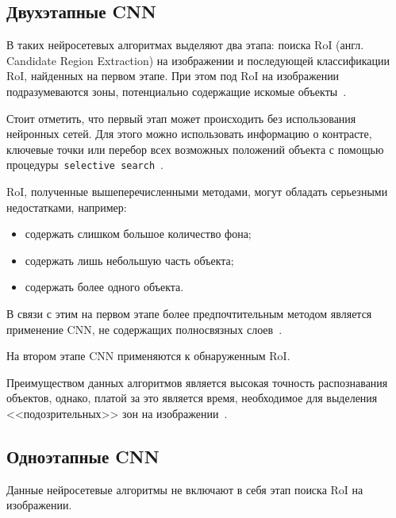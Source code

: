 \subsection{Двухэтапные CNN}

В таких нейросетевых алгоритмах выделяют два этапа: поиска RoI (англ. Candidate Region Extraction) на изображении и последующей классификации RoI, найденных на первом этапе. При этом под RoI на изображении подразумеваются зоны, потенциально содержащие искомые объекты~\cite{overview-of-two-stage-object-detection}. 


Стоит отметить, что первый этап может происходить без использования нейронных сетей. Для этого можно использовать информацию о контрасте, ключевые точки или перебор всех возможных положений объекта с помощью процедуры~\texttt{selective search}~\cite{realtime-recognition-algorythm}.

RoI, полученные вышеперечисленными методами, могут обладать серьезными недостатками, например:
\begin{itemize}[label=---]
    \item содержать слишком большое количество фона;
    \item содержать лишь небольшую часть объекта;
    \item содержать более одного объекта.
\end{itemize}

В связи с этим на первом этапе более предпочтительным методом является применение CNN, не содержащих полносвязных слоев~\cite{realtime-recognition-algorythm}.

На втором этапе CNN применяются к обнаруженным RoI.

Преимуществом данных алгоритмов является высокая точность распознавания объектов, однако, платой за это является время, необходимое для выделения <<подозрительных>> зон на изображении~\cite{overview-of-two-stage-object-detection}.

\subsection{Одноэтапные CNN}

Данные нейросетевые алгоритмы не включают в себя этап поиска RoI на изображении.


